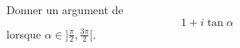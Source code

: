 Donner un argument de 
\[1+i\tan \alpha\]
lorsque $\alpha \in ]\frac{\pi}{2},\frac{3\pi}{2}[$. \bigskip